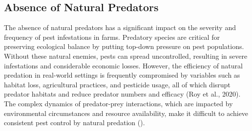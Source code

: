 \subsection{Absence of Natural Predators} The absence of natural predators has a significant impact on the severity and frequency of pest infestations in farms. Predatory species are critical for preserving ecological balance by putting top-down pressure on pest populations. Without these natural enemies, pests can spread uncontrolled, resulting in severe infestations and considerable economic losses. 
    However, the efficiency of natural predation in real-world settings is frequently compromised by variables such as habitat loss, agricultural practices, and pesticide usage, all of which disrupt predator habitats and reduce predator numbers and efficacy (Roy et al., 2020). The complex dynamics of predator-prey interactions, which are impacted by environmental circumstances and resource availability, make it difficult to achieve consistent pest control by natural predation (\cite{roy_2020_evaluating}).


